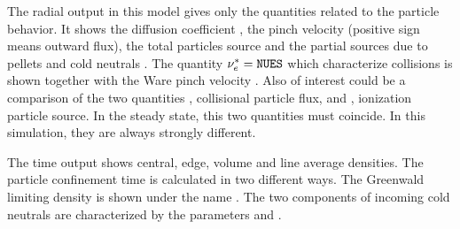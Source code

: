 The radial output in this model gives only the quantities related to the 
particle behavior. 
It shows the diffusion coefficient , the pinch velocity 
(positive sign means outward flux), the total particles source
 and the partial sources due to pellets  and cold
neutrals .
The quantity $\nu_e^*=\tt NUES$ which characterize collisions is
shown together with the Ware pinch velocity .
Also of interest could be a comparison of the two quantities ,
collisional particle flux, and , ionization particle source.
In the steady state, this two quantities must coincide.
In this simulation, they are always strongly different.

The time output shows central, edge, volume and line average densities.
The particle confinement time is calculated in two different ways.
The Greenwald limiting density is shown under the name .
The two components of incoming cold neutrals are characterized by the
parameters  and .

